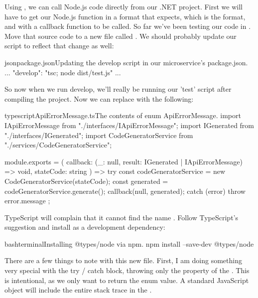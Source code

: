 \documentclass[paper=6in:9in,pagesize=pdftex,headinclude=on,footinclude=on,12pt,twoside]{scrbook}
\makeatletter
\newcommand{\at}{\makeatletter @\makeatother}
\makeatother
\begin{document}
Using , we can call Node.js code directly from our .NET project. First we will have to get our Node.js function in a format that  expects, which is the  format, and with a callback function to be called. So far we've been testing our code in . Move that source code to a new file called . We should probably update our  script to reflect that change as well:

\begin{codeInput}{json}{package.json}{Updating the develop script in our microservice's package.json.}
...
"develop": "tsc; node dist/test.js"
...
\end{codeInput}

So now when we run develop, we'll really be running our 'test' script after compiling the project. Now we can replace  with the following:

\begin{codeInput}{typescript}{ApiErrorMessage.ts}{The contents of enum ApiErrorMessage.}
import IApiErrorMessage from "./interfaces/IApiErrorMessage";
import IGenerated from "./interfaces/IGenerated";
import CodeGeneratorService from "./services/CodeGeneratorService";

module.exports = (
  callback: (_: null, result: IGenerated | IApiErrorMessage) => void,
  stateCode: string
) => {
  try {
    const codeGeneratorService = new CodeGeneratorService(stateCode);
    const generated = codeGeneratorService.generate();
    callback(null, generated);
  } catch (error) {
    throw error.message
  }
};  
\end{codeInput}

TypeScript will complain that it cannot find the name . Follow TypeScript's suggestion and install \codeword{\at } as a development dependency:

\begin{codeInput}{bash}{terminal}{Installing @types/node via npm.}
npm install --save-dev @types/node
\end{codeInput}

There are a few things to note with this new  file. First, I am doing something very special with the try / catch block, throwing only the  property of the . This is intentional, as we only want to return the  enum value. A standard JavaScript  object will include the entire stack trace in the .
\end{document}
